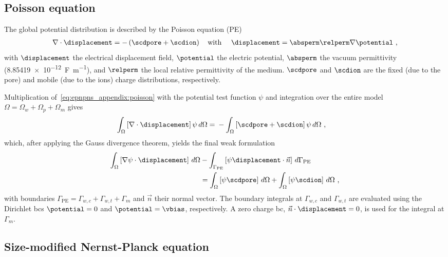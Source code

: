 \subsection{Poisson equation}
%

The global potential distribution is described by the Poisson equation (PE)~\cite{Lu-2012}
%
\begin{align}
  \label{eq:epnpns_appendix:poisson}
  \nabla \cdot \displacement = -\left( \scdpore + \scdion \right)
  \text{\quad with \quad}
  \displacement = \absperm \relperm \nabla \potential
  \text{ ,}
\end{align}
%
with $\displacement$ the electrical displacement field, $\potential$ the electric potential, $\absperm$ the
vacuum permittivity (\SI{8.85419e-12}{\farad\per\meter}), and $\relperm$ the local relative permittivity
of the medium. $\scdpore$ and $\scdion$ are the fixed (due to the pore) and mobile (due to the ions) charge
distributions, respectively.

Multiplication of~\cref{eq:epnpns_appendix:poisson} with the potential test function $\psi$ and integration
over the entire model $\Omega=\Omega_w+\Omega_p+\Omega_m$ gives
%
\begin{align}
  \displaystyle\int_{\Omega}
  \left[
    \nabla \cdot \displacement
  \right]
  \psi \,d\Omega
  ={}&
  - \displaystyle\int_{\Omega} \left[ \scdpore + \scdion \right] \psi \,d\Omega \text{ ,}
\end{align}
%
which, after applying the Gauss divergence theorem, yields the final weak formulation
%
\begin{align}
  \displaystyle\int_{\Omega}
  \left[
    \nabla \psi \cdot \displacement
  \right]
  \,d\Omega
  & - \displaystyle\int_{\Gamma_\text{PE}}
  \left[
    \psi \displacement \cdot \vec{n}
  \right]
  \,d\Gamma_\text{PE} \notag \\
  & =
  \displaystyle\int_{\Omega} \left[ \psi \scdpore \right] \,d\Omega
  +
  \displaystyle\int_{\Omega} \left[ \psi \scdion \right] \,d\Omega
  \text{ ,}
\end{align}
%
with boundaries $\Gamma_\text{PE}=\Gamma_{w,c}+\Gamma_{w,t}+\Gamma_m$ and $\vec{n}$ their normal vector. The
boundary integrals at $\Gamma_{w,c}$ and $\Gamma_{w,t}$ are evaluated using the Dirichlet \glspl{bc}
$\potential=0$ and $\potential=\vbias$, respectively. A zero charge \gls{bc}, $\vec{n} \cdot \displacement =
0$, is used for the integral at $\Gamma_{m}$.



\subsection{Size-modified Nernst-Planck equation}
%

